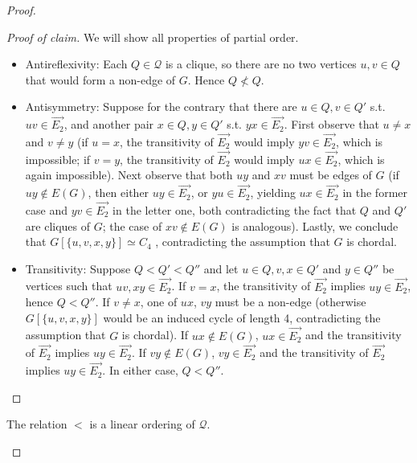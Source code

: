 \begin{proof}
\begin{enumerate}
		\begin{proof}[Proof of claim]
			We will show all properties of partial order.
			\begin{itemize}
				\item Antireflexivity: Each $Q \in \mathcal{Q}$ is a clique, so there are no two vertices $u, v \in Q$ that would form a	non-edge of $G$. Hence $Q \not< Q$.
				
				\item Antisymmetry: Suppose for the contrary that there are $u \in Q, v \in Q'$ s.t. $uv \in \overrightarrow{E_2}$, and another pair $x \in Q, y \in Q'$ s.t. $yx \in \overrightarrow{E_2}$. First observe that $u \neq x$ and $v \neq y$ (if $u = x$, the transitivity of $\overrightarrow{E_2}$ would imply $yv \in \overrightarrow{E_2}$, which is impossible; if $v = y$, the transitivity of $\overrightarrow{E_2}$ would imply $ux \in \overrightarrow{E_2}$, which is again impossible). Next observe that both $uy$ and $xv$ must be edges of $G$ (if $uy \notin E(G)$, then either $uy \in \overrightarrow{E_2}$, or $yu \in \overrightarrow{E_2}$, yielding $ux \in \overrightarrow{E_2}$ in the former case and $yv \in \overrightarrow{E_2}$ in the letter one, both contradicting the fact that $Q$ and $Q'$ are cliques of $G$; the case of $xv \notin E(G)$ is analogous). Lastly, we conclude that $G[\{u, v, x, y\}] \simeq C_4$ , contradicting the assumption that $G$ is chordal.
				
				\item Transitivity: Suppose $Q < Q' < Q''$ and let $u \in Q, v, x \in Q'$ and $y \in Q''$ be vertices such that $uv, xy \in \overrightarrow{E_2}$. If $v = x$, the transitivity of $\overrightarrow{E_2}$ implies $uy \in \overrightarrow{E_2}$, hence $Q < Q''$. If $v \neq x$, one of $ux$, $vy$
				must be a non-edge (otherwise $G[\{u, v, x, y\}]$ would be an induced cycle of length 4, contradicting the assumption that $G$ is chordal). If $ux \notin E(G)$, $ux \in \overrightarrow{E_2}$ and the transitivity of $\overrightarrow{E_2}$ implies $uy \in \overrightarrow{E_2}$. If $vy \notin E(G)$, $vy \in \overrightarrow{E_2}$ and the transitivity of $\overrightarrow{E_2}$ implies $uy \in \overrightarrow{E_2}$. In either case, $Q < Q''$.
			\end{itemize}
		\end{proof}
		
		\begin{claim}
			The relation $<$ is a linear ordering of $\mathcal{Q}$.
		\end{claim}
		

\end{enumerate}
\end{proof}
